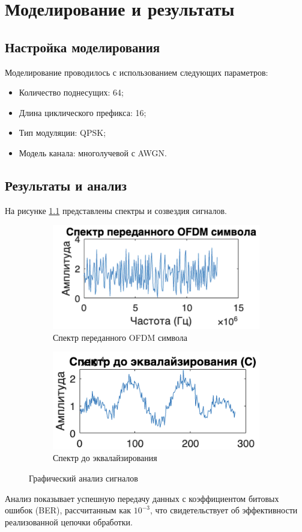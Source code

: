 \chapter{Моделирование и результаты}

\section{Настройка моделирования}

Моделирование проводилось с использованием следующих параметров:
\begin{itemize}
    \item Количество поднесущих: 64;
    \item Длина циклического префикса: 16;
    \item Тип модуляции: QPSK;
    \item Модель канала: многолучевой с AWGN.
\end{itemize}

\section{Результаты и анализ}

На рисунке \ref{fig:signal_analysis} представлены спектры и созвездия сигналов.

\begin{figure}[h]
    \centering
    \begin{subfigure}{0.45\textwidth}
        \centering
        \includegraphics{images/ofdm_spectrum_tx.png}
        \caption{Спектр переданного OFDM символа}
    \end{subfigure}
    \hfill
    \begin{subfigure}{0.45\textwidth}
        \centering
        \includegraphics{images/spectrum_before_eq.png}
        \caption{Спектр до эквалайзирования}
    \end{subfigure}
    \caption{Графический анализ сигналов}
    \label{fig:signal_analysis}
\end{figure}

Анализ показывает успешную передачу данных с коэффициентом битовых ошибок (BER), рассчитанным как $10^{-3}$, что свидетельствует об эффективности реализованной цепочки обработки.
